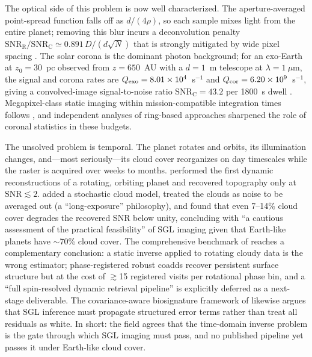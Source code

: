 ﻿\documentclass[twocolumn,10pt]{article}
\begin{document}
The optical side of this problem is now well characterized. The
aperture-averaged point-spread function falls off as $d/(4\rho)$, so each
sample mixes light from the entire planet; removing this blur incurs a
deconvolution penalty $\mathrm{SNR_R/SNR_C}\simeq0.891\,D/(d\sqrt{N})$
that is strongly mitigated by wide pixel spacing \citep{toth21,tt22mnras}.
The solar corona is the dominant photon background; for an exo-Earth at
$z_0=30$~pc observed from $z=650$~AU with a $d=1$~m telescope at
$\lambda=1~\mu$m, the signal and corona rates are
$Q_{\rm exo}=8.01\times10^4$~s$^{-1}$ and
$Q_{\rm cor}=6.20\times10^9$~s$^{-1}$, giving a convolved-image
signal-to-noise ratio $\mathrm{SNR_C}=43.2$ per 1800~s dwell
\citep{tt22mnras,tur26bench}. Megapixel-class static imaging within
mission-compatible integration times follows \citep{toth21,tt22mnras},
and independent analyses of ring-based approaches
\citep{mm22} sharpened the role of coronal statistics in these budgets.

The unsolved problem is temporal. The planet rotates and orbits, its
illumination changes, and---most seriously---its cloud cover reorganizes
on day timescales while the raster is acquired over weeks to months.
\citet{toth23} performed the first dynamic reconstructions of a rotating,
orbiting planet and recovered topography only at
$\mathrm{SNR}\lesssim2$. \citet{toth25clouds} added a stochastic cloud
model, treated the clouds as noise to be averaged out (a
``long-exposure'' philosophy), and found that even 7--14\% cloud cover
degrades the recovered SNR below unity, concluding with ``a cautious
assessment of the practical feasibility'' of SGL imaging given that
Earth-like planets have $\sim$70\% cloud cover. The comprehensive
benchmark of \citet{tur26bench} reaches a complementary conclusion: a
static inverse applied to rotating cloudy data is the wrong estimator;
phase-registered robust coadds recover persistent surface structure but
at the cost of $\gtrsim$15 registered visits per rotational phase bin,
and a ``full spin-resolved dynamic retrieval pipeline'' is explicitly
deferred as a next-stage deliverable. The covariance-aware biosignature
framework of \citet{cov26} likewise argues that SGL inference must
propagate structured error terms rather than treat all residuals as
white. In short: the field agrees that the time-domain inverse problem is
the gate through which SGL imaging must pass, and no published pipeline
yet passes it under Earth-like cloud cover.
\end{document}
